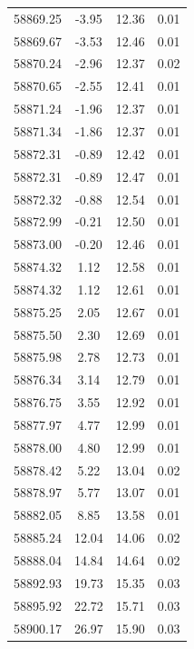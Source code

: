 \begin{longtable}{|c|c|c|c|}
 58869.25 &   -3.95 &       12.36 &          0.01 \\
 58869.67 &   -3.53 &       12.46 &          0.01 \\
 58870.24 &   -2.96 &       12.37 &          0.02 \\
 58870.65 &   -2.55 &       12.41 &          0.01 \\
 58871.24 &   -1.96 &       12.37 &          0.01 \\
 58871.34 &   -1.86 &       12.37 &          0.01 \\
 58872.31 &   -0.89 &       12.42 &          0.01 \\
 58872.31 &   -0.89 &       12.47 &          0.01 \\
 58872.32 &   -0.88 &       12.54 &          0.01 \\
 58872.99 &   -0.21 &       12.50 &          0.01 \\
 58873.00 &   -0.20 &       12.46 &          0.01 \\
 58874.32 &    1.12 &       12.58 &          0.01 \\
 58874.32 &    1.12 &       12.61 &          0.01 \\
 58875.25 &    2.05 &       12.67 &          0.01 \\
 58875.50 &    2.30 &       12.69 &          0.01 \\
 58875.98 &    2.78 &       12.73 &          0.01 \\
 58876.34 &    3.14 &       12.79 &          0.01 \\
 58876.75 &    3.55 &       12.92 &          0.01 \\
 58877.97 &    4.77 &       12.99 &          0.01 \\
 58878.00 &    4.80 &       12.99 &          0.01 \\
 58878.42 &    5.22 &       13.04 &          0.02 \\
 58878.97 &    5.77 &       13.07 &          0.01 \\
 58882.05 &    8.85 &       13.58 &          0.01 \\
 58885.24 &   12.04 &       14.06 &          0.02 \\
 58888.04 &   14.84 &       14.64 &          0.02 \\
 58892.93 &   19.73 &       15.35 &          0.03 \\
 58895.92 &   22.72 &       15.71 &          0.03 \\
 58900.17 &   26.97 &       15.90 &          0.03 \\

\end{longtable}
